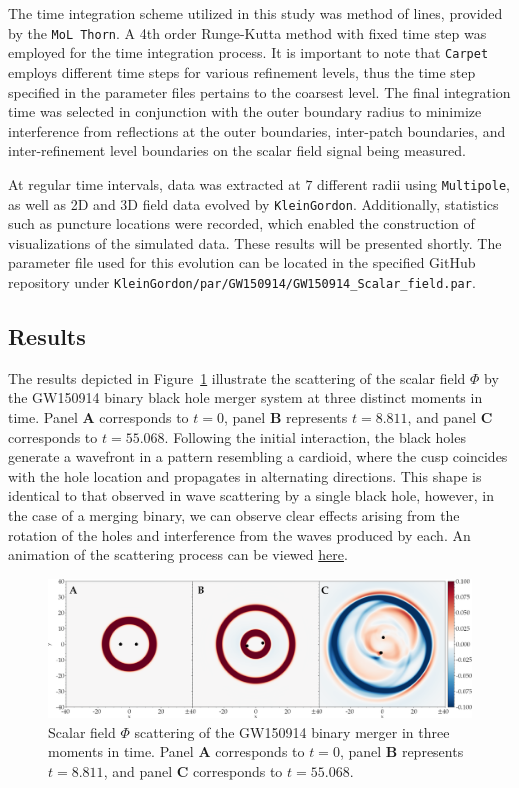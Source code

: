The time integration scheme utilized in this study was method of lines, provided by the \texttt{MoL Thorn}. A 4th order Runge-Kutta method with fixed time step was employed for the time integration process. It is important to note that \texttt{Carpet} employs different time steps for various refinement levels, thus the time step specified in the parameter files pertains to the coarsest level. The final integration time was selected in conjunction with the outer boundary radius to minimize interference from reflections at the outer boundaries, inter-patch boundaries, and inter-refinement level boundaries on the scalar field signal being measured.

At regular time intervals, data was extracted at $7$ different radii using \texttt{Multipole}, as well as 2D and 3D field data evolved by \texttt{KleinGordon}. Additionally, statistics such as puncture locations were recorded, which enabled the construction of visualizations of the simulated data. These results will be presented shortly. The parameter file used for this evolution can be located in the specified GitHub repository under \texttt{KleinGordon/par/GW150914/GW150914\_Scalar\_field.par}.

\subsection{Results}

The results depicted in Figure~\ref{fig:wave_scattering_results} illustrate the scattering of the scalar field $\Phi$ by the GW150914 binary black hole merger system at three distinct moments in time. Panel \textbf{A} corresponds to $t = 0$, panel \textbf{B} represents $t = 8.811$, and panel \textbf{C} corresponds to $t = 55.068$. Following the initial interaction, the black holes generate a wavefront in a pattern resembling a cardioid, where the cusp coincides with the hole location and propagates in alternating directions. This shape is identical to that observed in wave scattering by a single black hole, however, in the case of a merging binary, we can observe clear effects arising from the rotation of the holes and interference from the waves produced by each. An animation of the scattering process can be viewed \href{https://github.com/lucass-carneiro/phd-thesis/tree/main/img/wave_scattering/scattering.gif}{here}.

\begin{figure}[h]
  \centering
  \includegraphics[width=\linewidth]{img/wave_scattering/scattering_frames}
  \caption{Scalar field $\Phi$ scattering of the GW150914 binary merger in three moments in time. Panel \textbf{A} corresponds to $t = 0$, panel \textbf{B} represents $t = 8.811$, and panel \textbf{C} corresponds to $t = 55.068$.}
  \label{fig:wave_scattering_results}
\end{figure}